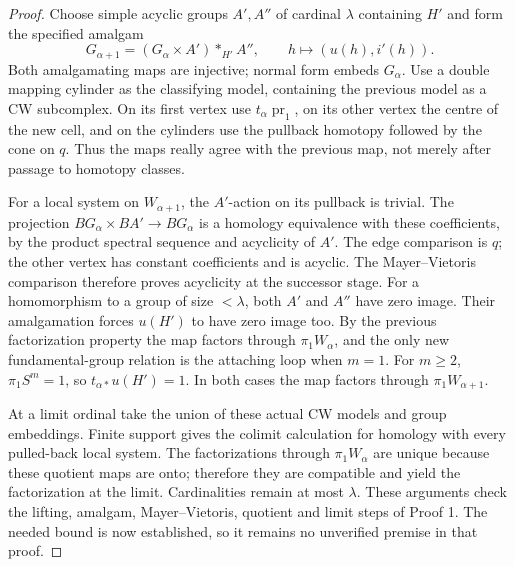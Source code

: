 \begin{proof}
Choose simple acyclic groups $A',A''$ of cardinal $\lambda$ containing
$H'$ and form the specified amalgam
\[
 G_{\alpha+1}=(G_\alpha\times A')*_{H'}A'',
 \qquad h\longmapsto (u(h),i'(h)).
\]
Both amalgamating maps are injective; normal form embeds $G_\alpha$.
Use a double mapping cylinder as the classifying model, containing the
previous model as a CW subcomplex. On its first vertex use
$t_\alpha\operatorname{pr}_1$, on its other vertex the centre of the
new cell, and on the cylinders use the pullback homotopy followed by
the cone on $q$. Thus the maps really agree with the previous map,
not merely after passage to homotopy classes.

For a local system on $W_{\alpha+1}$, the $A'$-action on its pullback
is trivial. The projection $BG_\alpha\times BA'\to BG_\alpha$
is a homology equivalence with these coefficients, by the product
spectral sequence and acyclicity of $A'$. The edge comparison is $q$;
the other vertex has constant coefficients and is acyclic. The
Mayer--Vietoris comparison therefore proves acyclicity at the successor
stage. For a homomorphism to a group of size $<\lambda$, both $A'$
and $A''$ have zero image. Their amalgamation forces $u(H')$ to have
zero image too. By the previous factorization property the map factors
through $\pi_1W_\alpha$, and the only new fundamental-group relation
is the attaching loop when $m=1$. For $m\geq2$, $\pi_1S^m=1$, so
$t_{\alpha*}u(H')=1$. In both cases the map factors through
$\pi_1W_{\alpha+1}$.

At a limit ordinal take the union of these actual CW models and group
embeddings. Finite support gives the colimit calculation for homology
with every pulled-back local system. The factorizations through
$\pi_1W_\alpha$ are unique because these quotient maps are onto;
therefore they are compatible and yield the factorization at the
limit. Cardinalities remain at most $\lambda$. These arguments check
the lifting, amalgam, Mayer--Vietoris, quotient and limit steps of
Proof 1. The needed bound is now established, so it remains no
unverified premise in that proof.
\end{proof}

